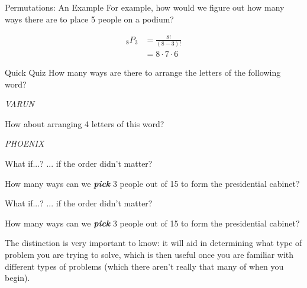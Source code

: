 \documentclass[aspectratio=169,xcolor=dvipsnames]{beamer}
\begin{document}
\begin{frame}[t]{Permutations: An Example}
    For example, how would we figure out how many ways there are to place 5 people on a podium?

    \vspace{1cm}
    \begin{align*}
        _8P_3
        &=\frac{8!}{(8-3)!}\\
        &=8\cdot7\cdot6
    \end{align*}
\end{frame}
\begin{frame}[t]{Quick Quiz}
    How many ways are there to arrange the letters of the following word?

    \vspace{0.5cm}
    \begin{center}
        \textit{VARUN}
    \end{center}
    
    \vspace{1cm}
    How about arranging 4 letters of this word?
    
    \vspace{0.5cm}
    \begin{center}
        \textit{PHOENIX}
    \end{center}
\end{frame}
\begin{frame}[t]{What if...?}
    ... if the order didn't matter?
    
    \vspace{.5em}
    
    How many ways can we \textit{\textbf{pick}} 3 people out of 15 to form the presidential cabinet?
\end{frame}

\begin{frame}[t]{What if...?}
    ... if the order didn't matter?
    
    \vspace{.5em}
    
    How many ways can we \textit{\textbf{pick}} 3 people out of 15 to form the presidential cabinet?

    \vspace{1.5cm}

    The distinction is very important to know: it will aid in determining what type of problem you are trying to solve, which is then useful once you are familiar with different types of problems (which there aren't really that many of when you begin).
\end{frame}
\end{document}
